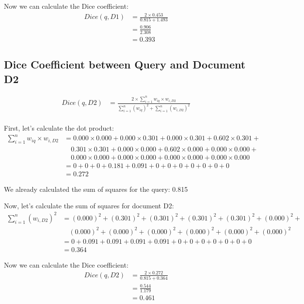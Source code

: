 \documentclass{article}
\begin{document}
Now we can calculate the Dice coefficient:
\begin{align}
Dice(q, D1) &= \frac{2 \times 0.453}{0.815 + 1.493} \\
&= \frac{0.906}{2.308} \\
&= 0.393
\end{align}

\subsection{Dice Coefficient between Query and Document D2}
\begin{align}
Dice(q, D2) &= \frac{2 \times \sum_{i=1}^{n} w_{iq} \times w_{i,D2}}{\sum_{i=1}^{n} (w_{iq})^2 + \sum_{i=1}^{n} (w_{i,D2})^2} \\
\end{align}

First, let's calculate the dot product:
\begin{align}
\sum_{i=1}^{n} w_{iq} \times w_{i,D2} &= 0.000 \times 0.000 + 0.000 \times 0.301 + 0.000 \times 0.301 + 0.602 \times 0.301 + \\
&\quad 0.301 \times 0.301 + 0.000 \times 0.000 + 0.602 \times 0.000 + 0.000 \times 0.000 + \\
&\quad 0.000 \times 0.000 + 0.000 \times 0.000 + 0.000 \times 0.000 + 0.000 \times 0.000 \\
&= 0 + 0 + 0 + 0.181 + 0.091 + 0 + 0 + 0 + 0 + 0 + 0 + 0 \\
&= 0.272
\end{align}

We already calculated the sum of squares for the query: 0.815

Now, let's calculate the sum of squares for document D2:
\begin{align}
\sum_{i=1}^{n} (w_{i,D2})^2 &= (0.000)^2 + (0.301)^2 + (0.301)^2 + (0.301)^2 + (0.301)^2 + (0.000)^2 + \\
&\quad (0.000)^2 + (0.000)^2 + (0.000)^2 + (0.000)^2 + (0.000)^2 + (0.000)^2 \\
&= 0 + 0.091 + 0.091 + 0.091 + 0.091 + 0 + 0 + 0 + 0 + 0 + 0 + 0 \\
&= 0.364
\end{align}

Now we can calculate the Dice coefficient:
\begin{align}
Dice(q, D2) &= \frac{2 \times 0.272}{0.815 + 0.364} \\
&= \frac{0.544}{1.179} \\
&= 0.461
\end{align}
\end{document}
